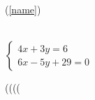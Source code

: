 \documentclass[12pt, a4paper, oneside]{report}	%
\renewcommand{\headrulewidth}{0.3 mm} %
\begin{document}
\thispagestyle{firststyle}



\usepackage{fancybox, fancyhdr}

\pagestyle{fancy}


\fancyhead[*]{}
\fancyfoot[*]{}

\renewcommand{\headrulewidth}{0pt}



\usepackage{amsmath}
\usepackage{amsfonts}
\usepackage{amssymb}

\begin{equation}\label{name}
\end{equation}

(\ref{name})

\text{}

\begin{eqnarray}
\end{eqnarray}

$\begin{cases}
	4x + 3y = 6\\
	6x - 5y + 29= 0
\end{cases}$




\circ %
\times %

(\big (\Big (\bigg (\Bigg



\usepackage{enumitem}
\end{document}
